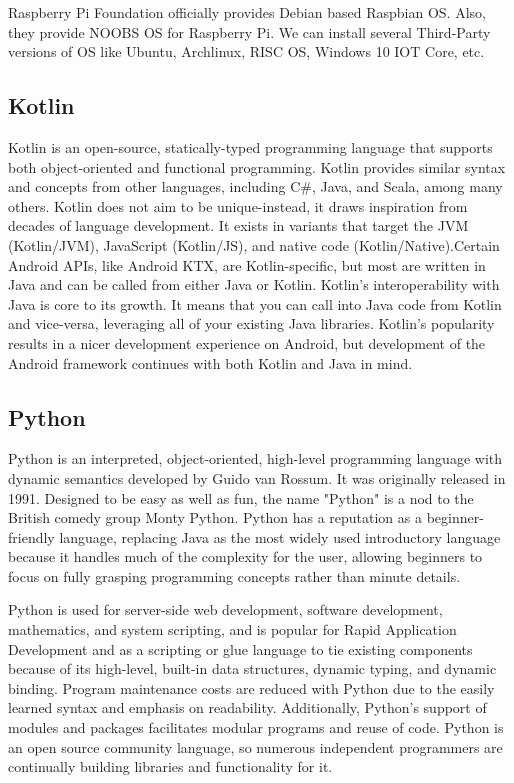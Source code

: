 Raspberry Pi Foundation officially provides Debian based Raspbian OS. Also, they provide NOOBS OS for Raspberry Pi. We can install several Third-Party versions of OS like Ubuntu, Archlinux, RISC OS, Windows 10 IOT Core, etc.
\subsection{Kotlin}
\par Kotlin is an open-source, statically-typed programming language that supports both object-oriented and functional programming. Kotlin provides similar syntax and concepts from other languages, including C\#, Java, and Scala, among many others. Kotlin does not aim to be unique-instead, it draws inspiration from decades of language development. It exists in variants that target the JVM (Kotlin/JVM), JavaScript (Kotlin/JS), and native code (Kotlin/Native).Certain Android APIs, like Android KTX, are Kotlin-specific, but most are written in Java and can be called from either Java or Kotlin. Kotlin’s interoperability with Java is core to its growth. It means that you can call into Java code from Kotlin and vice-versa, leveraging all of your existing Java libraries. Kotlin’s popularity results in a nicer development experience on Android, but development of the Android framework continues with both Kotlin and Java in mind.
\subsection{Python}
\par Python is an interpreted, object-oriented, high-level programming language with dynamic semantics developed by Guido van Rossum. It was originally released in 1991. Designed to be easy as well as fun, the name "Python" is a nod to the British comedy group Monty Python. Python has a reputation as a beginner-friendly language, replacing Java as the most widely used introductory language because it handles much of the complexity for the user, allowing beginners to focus on fully grasping programming concepts rather than minute details.
\par Python is used for server-side web development, software development, mathematics, and system scripting, and is popular for Rapid Application Development and as a scripting or glue language to tie existing components because of its high-level, built-in data structures, dynamic typing, and dynamic binding. Program maintenance costs are reduced with Python due to the easily learned syntax and emphasis on readability. Additionally, Python's support of modules and packages facilitates modular programs and reuse of code. Python is an open source community language, so numerous independent programmers are continually building libraries and functionality for it.

